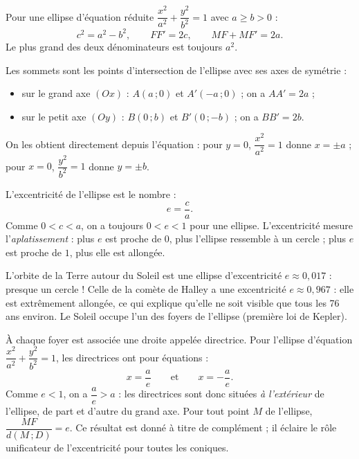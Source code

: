 \documentclass[11pt]{article}
\newcommand{\cle}[1]{{\popxbold\color{popdark}#1}}
\newcounter{popsec}
\newcounter{popsub}
\newcommand{\courssub}[1]{%
  \stepcounter{popsub}%
  \par\vspace{9pt}\noindent{\popxbold\fontsize{11.5}{13}\selectfont\color{popink}{\color{poporange}\thepopsec.\thepopsub}\hspace{6pt}#1}\par\nopagebreak\vspace{4pt}
}
\begin{document}
\begin{aretenir}
Pour une ellipse d'équation réduite $\dfrac{x^2}{a^2} + \dfrac{y^2}{b^2} = 1$ avec $a \geq b > 0$ :
\[ c^2 = a^2 - b^2, \qquad FF' = 2c, \qquad MF + MF' = 2a. \]
Le plus grand des deux dénominateurs est toujours $a^2$.
\end{aretenir}

\courssub{Sommets, foyers et excentricité}

\begin{definition}
Les \cle{sommets} sont les points d'intersection de l'ellipse avec ses axes de symétrie :
\begin{itemize}
\item sur le grand axe $(Ox)$ : $A(a\,;0)$ et $A'(-a\,;0)$ ; on a $AA' = 2a$ ;
\item sur le petit axe $(Oy)$ : $B(0\,;b)$ et $B'(0\,;-b)$ ; on a $BB' = 2b$.
\end{itemize}
On les obtient directement depuis l'équation : pour $y = 0$, $\dfrac{x^2}{a^2} = 1$ donne $x = \pm a$ ; pour $x = 0$, $\dfrac{y^2}{b^2} = 1$ donne $y = \pm b$.
\end{definition}

\begin{definition}[Excentricité]
L'\cle{excentricité} de l'ellipse est le nombre :
\[ e = \frac{c}{a}. \]
Comme $0 < c < a$, on a toujours $0 < e < 1$ pour une ellipse. L'excentricité mesure l'\emph{aplatissement} : plus $e$ est proche de $0$, plus l'ellipse ressemble à un cercle ; plus $e$ est proche de $1$, plus elle est allongée.
\end{definition}

\begin{savaistu}
L'orbite de la Terre autour du Soleil est une ellipse d'excentricité $e \approx 0{,}017$ : presque un cercle ! Celle de la comète de Halley a une excentricité $e \approx 0{,}967$ : elle est extrêmement allongée, ce qui explique qu'elle ne soit visible que tous les 76 ans environ. Le Soleil occupe l'un des foyers de l'ellipse (première loi de Kepler).
\end{savaistu}

\begin{propriete}
À chaque foyer est associée une droite appelée \cle{directrice}. Pour l'ellipse d'équation $\dfrac{x^2}{a^2} + \dfrac{y^2}{b^2} = 1$, les directrices ont pour équations :
\[ x = \frac{a}{e} \qquad \text{et} \qquad x = -\frac{a}{e}. \]
Comme $e < 1$, on a $\dfrac{a}{e} > a$ : les directrices sont donc situées \emph{à l'extérieur} de l'ellipse, de part et d'autre du grand axe. Pour tout point $M$ de l'ellipse, $\dfrac{MF}{d(M\,;D)} = e$. Ce résultat est donné à titre de complément ; il éclaire le rôle unificateur de l'excentricité pour toutes les coniques.
\end{propriete}
\end{document}
